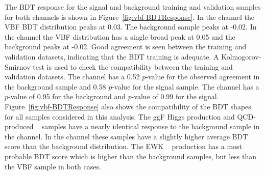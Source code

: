 The BDT response for  the signal and background training and validation
samples for both channels is shown in Figure~\ref{fig:vbf-BDTResponse}.
In the \fourcentral channel the VBF \Hbb BDT distribution peaks at 0.03.
The background sample peaks at -0.02.  In the \twocentral channel the
VBF \Hbb distribution has a single broad peak at 0.05 and the
background peaks at -0.02. Good agreement is seen between the training
and validation datasets, indicating that the BDT training is adequate.
A Kolmogorov-Smirnov test is used to check the compatibility between
the training and validation datasets.  The \twocentral channel has
a 0.52 $p$-value for the observed agreement in the background sample
and 0.58 $p$-value for the signal sample. The \fourcentral channel has
a $p$-value of 0.95 for the background and $p$-value of 0.99 for the signal.
Figure~\ref{fig:vbf-BDTResponse} also shows the compatibility of the BDT
shapes for all samples considered in this analysis.
The ggF Higgs production and QCD-produced \zjets ~ samples have a
nearly identical response to the background sample in the \fourcentral channel.
In the \twocentral channel these samples have a slightly higher average BDT score than the background distribution.
The EWK \zjets ~ production has a most probable BDT score which is higher than the
background samples, but less than the VBF \Hbb sample in both cases.



